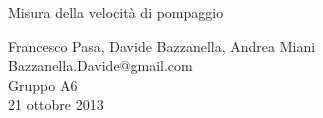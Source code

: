 \begin{center}

	\vspace{0.5cm}
     	{\huge Misura della velocità di pompaggio}
	\vspace{0.5cm}

      	{\large Francesco Pasa, Davide Bazzanella, Andrea Miani} \\
      	{Bazzanella.Davide@gmail.com} \\
		{\large Gruppo A6} \\
	
	\vspace{0.2cm}
      	{\large 21 ottobre 2013}
    
\end{center}
